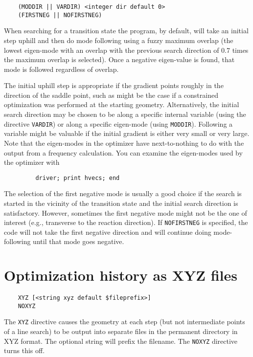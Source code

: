 \begin{verbatim}
    (MODDIR || VARDIR) <integer dir default 0>
    (FIRSTNEG || NOFIRSTNEG)
\end{verbatim}

When searching for a transition state the program, by default,
will take an initial step uphill and then do mode following
using a fuzzy maximum overlap (the lowest eigen-mode with an
overlap with the previous search direction of 0.7 times the
maximum overlap is selected).  Once a negative eigen-value
is found, that mode is followed regardless of overlap.

The initial uphill step is appropriate if the gradient points roughly
in the direction of the saddle point, such as might be the case if a
constrained optimization was performed at the starting geometry.
Alternatively, the initial search direction may be chosen to be along
a specific internal variable (using the directive
\verb+VARDIR+) or along a specific eigen-mode (using \verb+MODDIR+).
Following a variable might be valuable if the initial gradient is
either very small or very large.  Note that the eigen-modes in the
optimizer have next-to-nothing to do with the output from a frequency
calculation.  You can examine the eigen-modes used by the optimizer
with

\begin{verbatim}
         driver; print hvecs; end
\end{verbatim}

The selection of the first negative mode is usually a good choice if
the search is started in the vicinity of the transition state and the
initial search direction is satisfactory.  However, sometimes the
first negative mode might not be the one of interest (e.g., transverse
to the reaction direction).  If \verb+NOFIRSTNEG+ is specified, the
code will not take the first negative direction and will continue doing
mode-following until that mode goes negative.

\section{Optimization history as XYZ files}

\begin{verbatim}
    XYZ [<string xyz default $fileprefix>]
    NOXYZ
\end{verbatim}

The \verb+XYZ+ directive causes the geometry at each step (but not
intermediate points of a line search) to be output into separate files
in the permanent directory in XYZ format.  The optional string will
prefix the filename.  The \verb+NOXYZ+ directive turns this off.

